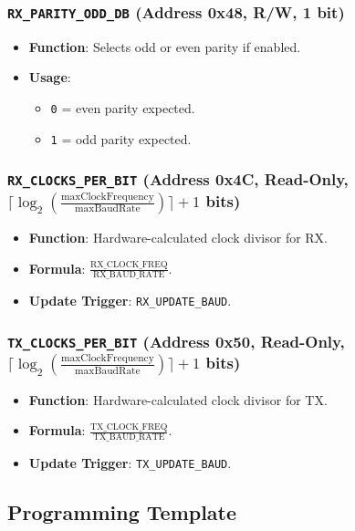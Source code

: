 \subsubsection{\texttt{RX\_PARITY\_ODD\_DB} (Address 0x48, R/W, 1 bit)}
\begin{itemize}[noitemsep]
\item \textbf{Function}: Selects odd or even parity if enabled.
\item \textbf{Usage}:
  \begin{itemize}[noitemsep]
  \item \texttt{0} = even parity expected.
  \item \texttt{1} = odd parity expected.
  \end{itemize}
\end{itemize}

\subsubsection{\texttt{RX\_CLOCKS\_PER\_BIT} (Address 0x4C, Read-Only, \(\lceil\log_2(\tfrac{\text{maxClockFrequency}}{\text{maxBaudRate}})\rceil +1\) bits)}
\begin{itemize}[noitemsep]
\item \textbf{Function}: Hardware-calculated clock divisor for RX.
\item \textbf{Formula}: \(\frac{\text{RX\_CLOCK\_FREQ}}{\text{RX\_BAUD\_RATE}}\).
\item \textbf{Update Trigger}: \texttt{RX\_UPDATE\_BAUD}.
\end{itemize}

\subsubsection{\texttt{TX\_CLOCKS\_PER\_BIT} (Address 0x50, Read-Only, \(\lceil\log_2(\tfrac{\text{maxClockFrequency}}{\text{maxBaudRate}})\rceil +1\) bits)}
\begin{itemize}[noitemsep]
\item \textbf{Function}: Hardware-calculated clock divisor for TX.
\item \textbf{Formula}: \(\frac{\text{TX\_CLOCK\_FREQ}}{\text{TX\_BAUD\_RATE}}\).
\item \textbf{Update Trigger}: \texttt{TX\_UPDATE\_BAUD}.
\end{itemize}

\newpage
\subsection{Programming Template}

